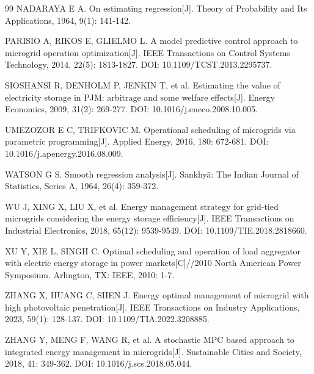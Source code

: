 \documentclass[withoutpreface,bwprint]{cumcmthesis}
\begin{document}
{\begin{thebibliography}{99}
 NADARAYA E A. On estimating regression[J]. Theory of Probability and Its Applications, 1964, 9(1): 141-142.

 PARISIO A, RIKOS E, GLIELMO L. A model predictive control approach to microgrid operation optimization[J]. IEEE Transactions on Control Systems Technology, 2014, 22(5): 1813-1827. DOI: 10.1109/TCST.2013.2295737.

 SIOSHANSI R, DENHOLM P, JENKIN T, et al. Estimating the value of electricity storage in PJM: arbitrage and some welfare effects[J]. Energy Economics, 2009, 31(2): 269-277. DOI: 10.1016/j.eneco.2008.10.005.

 UMEZOZOR E C, TRIFKOVIC M. Operational scheduling of microgrids via parametric programming[J]. Applied Energy, 2016, 180: 672-681. DOI: 10.1016/j.apenergy.2016.08.009.

 WATSON G S. Smooth regression analysis[J]. Sankhyā: The Indian Journal of Statistics, Series A, 1964, 26(4): 359-372.

 WU J, XING X, LIU X, et al. Energy management strategy for grid-tied microgrids considering the energy storage efficiency[J]. IEEE Transactions on Industrial Electronics, 2018, 65(12): 9539-9549. DOI: 10.1109/TIE.2018.2818660.

 XU Y, XIE L, SINGH C. Optimal scheduling and operation of load aggregator with electric energy storage in power markets[C]//2010 North American Power Symposium. Arlington, TX: IEEE, 2010: 1-7.

 ZHANG X, HUANG C, SHEN J. Energy optimal management of microgrid with high photovoltaic penetration[J]. IEEE Transactions on Industry Applications, 2023, 59(1): 128-137. DOI: 10.1109/TIA.2022.3208885.

 ZHANG Y, MENG F, WANG R, et al. A stochastic MPC based approach to integrated energy management in microgrids[J]. Sustainable Cities and Society, 2018, 41: 349-362. DOI: 10.1016/j.scs.2018.05.044.

\end{thebibliography}
}
\end{document}
